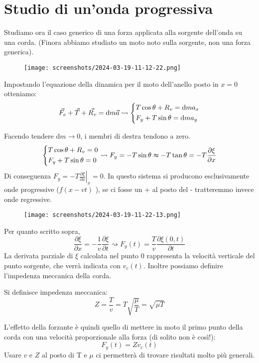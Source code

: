 \section{Studio di un'onda progressiva}


Studiamo ora il caso generico di una forza applicata alla sorgente dell'onda su una corda. (Finora abbiamo studiato un moto noto sulla sorgente, non una forza generica).

\begin{figure}[H]
	\centering
	\texttt{[image: screenshots/2024-03-19-11-12-22.png]}
\end{figure}

Impostando l'equazione della dinamica per il moto dell'anello posto in \(x=0\) otteniamo:
\[
	\vec{F_e} + \vec{T} +\vec{R_v}  = \mathrm{d}m \vec{a} \rightsquigarrow \begin{dcases}
		T\cos \theta + R_v = \mathrm{d} m a_x\\
		F_y + T\sin \theta =\mathrm{d} m a_y  \\
	\end{dcases}
\]

Facendo tendere \(\mathrm{d} m \to 0\), i membri di destra tendono a zero.
\[
	\begin{dcases}
		T\cos \theta + R_v = 0\\
		F_y + T\sin \theta = 0  \\
	\end{dcases}
	\rightsquigarrow F_y = -T\sin \theta \thickapprox -T \tan \theta = -T \frac{\partial \xi }{\partial x}
\]
Di conseguenza \(F_y = -T \left. \frac{\partial \xi }{\partial x}\right\vert_x=0 \). In questo sistema si producono esclusivamente onde progressive (\(f(x-vt)\) ), se ci fosse un + al posto del - tratteremmo invece onde regressive.
\begin{figure}[H]
	\centering
	\texttt{[image: screenshots/2024-03-19-11-22-13.png]}
\end{figure}
Per quanto scritto sopra,
\[
	\frac{\partial \xi }{\partial x} = - \frac{1}{v} \frac{\partial \xi }{\partial t} \rightsquigarrow F_y(t) = \frac{T}{v}\frac{\partial \xi (0,t)}{\partial t} 
\]
La derivata parziale di \(\xi \) calcolata nel punto 0 rappresenta la velocità verticale del punto sorgente, che verrà indicata con \(v_c(t)\). Inoltre possiamo definire l'impedenza meccanica della corda.
\begin{definition}
	Si definisce impedenza meccanica:
	\[
		Z=\frac{T}{v}= T \sqrt{\frac{\mu }{T}} = \sqrt{\mu T}  
	\]
\end{definition} 
L'effetto della forzante è quindi quello di mettere in moto il primo punto della corda con una velocità proporzionale alla forza (di solito non è così!):
\[
	F_y(t) = Zv_c(t)
\]
Usare \(v\) e \(Z\) al posto di T e \(\mu \) ci permetterà di trovare risultati molto più generali.

